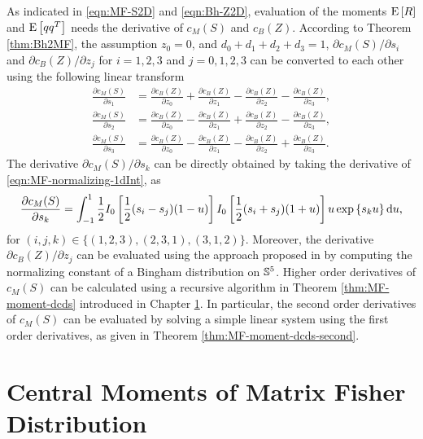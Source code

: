 As indicated in \eqref{eqn:MF-S2D} and \eqref{eqn:Bh-Z2D}, evaluation of the moments $\mathrm{E}\left[ R \right]$ and $\mathrm{E}\left[ qq^T \right]$ needs the derivative of $c_M(S)$ and $c_B(Z)$.
According to Theorem \ref{thm:Bh2MF}, the assumption $z_0 = 0$, and $d_0+d_1+d_2+d_3 = 1$, $\partial c_M(S)/\partial s_i$ and $\partial c_B(Z)/\partial z_j$ for $i=1,2,3$ and $j=0,1,2,3$ can be converted to each other using the following linear transform
\begin{subequations}
	\begin{align}
		\frac{\partial c_M(S)}{\partial s_1} &= \frac{\partial c_B(Z)}{\partial z_0} + \frac{\partial c_B(Z)}{\partial z_1} - \frac{\partial c_B(Z)}{\partial z_2} - \frac{\partial c_B(Z)}{\partial z_3}, \\
		\frac{\partial c_M(S)}{\partial s_2} &= \frac{\partial c_B(Z)}{\partial z_0} - \frac{\partial c_B(Z)}{\partial z_1} + \frac{\partial c_B(Z)}{\partial z_2} - \frac{\partial c_B(Z)}{\partial z_3}, \\
		\frac{\partial c_M(S)}{\partial s_3} &= \frac{\partial c_B(Z)}{\partial z_0} - \frac{\partial c_B(Z)}{\partial z_1} - \frac{\partial c_B(Z)}{\partial z_2} + \frac{\partial c_B(Z)}{\partial z_3}.
	\end{align}
\end{subequations}
The derivative $\partial c_M(S)/\partial s_k$ can be directly obtained by taking the derivative of \eqref{eqn:MF-normalizing-1dInt}, as
\begin{align} \label{eqn:MF-S2D-1dint}
	\frac{\partial c_M(S)}{\partial s_k} = \int_{-1}^1 \frac{1}{2} I_0\left[ \frac{1}{2}(s_i-s_j)(1-u) \right] I_0\left[ \frac{1}{2}(s_i+s_j)(1+u) \right] u\exp\left\{ s_ku \right\} \mathrm{d} u,
\end{align}
for $(i,j,k) \in \{(1,2,3),(2,3,1),(3,1,2)\}$.
Moreover, the derivative $\partial c_B(Z)/\partial z_j$ can be evaluated using the approach proposed in \cite{kume2007derivatives} by computing the normalizing constant of a Bingham distribution on $\mathbb{S}^5$.
Higher order derivatives of $c_M(S)$ can be calculated using a recursive algorithm in Theorem \ref{thm:MF-moment-dcds} introduced in Chapter \ref{section:MF-moments}.
In particular, the second order derivatives of $c_M(S)$ can be evaluated by solving a simple linear system using the first order derivatives, as given in Theorem \ref{thm:MF-moment-dcds-second}.

\section{Central Moments of Matrix Fisher Distribution} \label{section:MF-moments}

